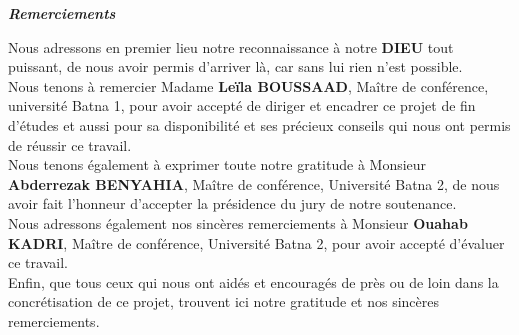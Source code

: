 \newpage
\thispagestyle{empty}
\begin{center}
\textcolor[rgb]{0,0,1}{{\Huge\textbf{\textit{Remerciements}}}}
\end{center}

\vspace{1 cm}

Nous adressons en premier lieu notre reconnaissance à notre \textbf{DIEU} tout puissant, de nous avoir permis d'arriver là, car sans lui rien n’est possible. \\

Nous tenons à remercier Madame \textbf{Leïla BOUSSAAD}, Maître de conférence, université Batna 1, pour avoir accepté de diriger et encadrer ce projet de fin d'études et aussi pour sa disponibilité et ses précieux conseils qui nous ont permis de réussir ce travail.\\

Nous tenons également à exprimer toute notre gratitude à Monsieur \textbf{Abderrezak BENYAHIA}, Maître de conférence, Université Batna 2, de nous avoir fait l'honneur d'accepter la présidence du jury de notre soutenance. \\

Nous adressons également nos sincères remerciements à Monsieur \textbf{Ouahab KADRI}, Maître de conférence, Université Batna 2, pour avoir accepté d'évaluer ce travail.\\

Enfin, que tous ceux qui nous ont aidés et encouragés de près ou de loin dans la concrétisation de ce projet, trouvent ici notre gratitude et nos sincères remerciements. 


